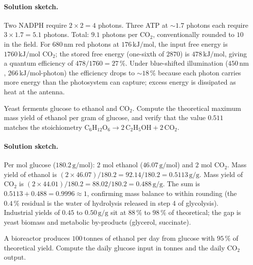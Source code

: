 \paragraph{Solution sketch.}
Two NADPH require $2 \times 2 = 4$ photons. Three ATP at $\sim 1.7$
photons each require $3 \times 1.7 = 5.1$ photons. Total: $9.1$
photons per CO$_2$, conventionally rounded to $10$ in the field. For
$680\,\text{nm}$ red photons at $176\,\text{kJ}/\text{mol}$, the input
free energy is $1760\,\text{kJ}/\text{mol}$ CO$_2$; the stored
free energy (one-sixth of $2870$) is $478\,\text{kJ}/\text{mol}$,
giving a quantum efficiency of $478/1760 = 27\,\%$. Under blue-shifted
illumination ($450\,\text{nm}$, $266\,\text{kJ}/\text{mol}$-photon) the
efficiency drops to $\sim 18\,\%$ because each photon carries more
energy than the photosystem can capture; excess energy is dissipated
as heat at the antenna.

\begin{exercise}
Yeast ferments glucose to ethanol and CO$_2$. Compute the theoretical
maximum mass yield of ethanol per gram of glucose, and verify that
the value $0.511$ matches the stoichiometry $\text{C}_6\text{H}_{12}\text{O}_6
\rightarrow 2\,\text{C}_2\text{H}_5\text{OH} + 2\,\text{CO}_2$.
\end{exercise}

\paragraph{Solution sketch.}
Per mol glucose ($180.2\,\text{g}/\text{mol}$): $2$ mol ethanol
($46.07\,\text{g}/\text{mol}$) and $2$ mol CO$_2$. Mass yield of
ethanol is $(2 \times 46.07)/180.2 = 92.14/180.2 = 0.5113\,\text{g}/
\text{g}$. Mass yield of CO$_2$ is $(2 \times 44.01)/180.2 =
88.02/180.2 = 0.488\,\text{g}/\text{g}$. The sum is $0.5113 + 0.488 =
0.9996 \approx 1$, confirming mass balance to within rounding (the
$0.4\,\%$ residual is the water of hydrolysis released in step 4 of
glycolysis). Industrial yields of $0.45$ to $0.50\,\text{g}/\text{g}$
sit at $88\,\%$ to $98\,\%$ of theoretical; the gap is yeast biomass
and metabolic by-products (glycerol, succinate).

\begin{exercise}
A bioreactor produces $100\,\text{tonnes}$ of ethanol per day from
glucose with $95\,\%$ of theoretical yield. Compute the daily glucose
input in tonnes and the daily CO$_2$ output.
\end{exercise}

